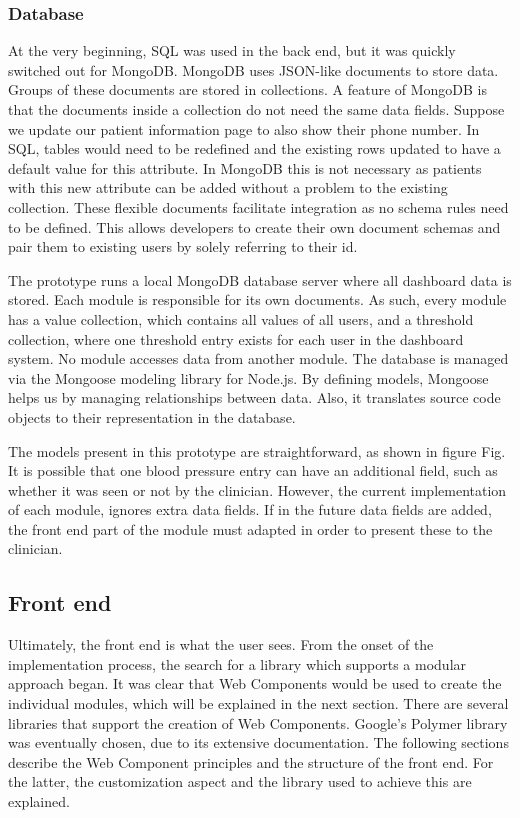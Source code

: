         \subsubsection{Database}

        At the very beginning, SQL was used in the back end, but it was quickly switched out for MongoDB\@. MongoDB uses JSON-like documents to store data. Groups of these documents are stored in collections. A feature of MongoDB is that the documents inside a collection do not need the same data fields. Suppose we update our patient information page to also show their phone number. In SQL, tables would need to be redefined and the existing rows updated to have a default value for this attribute. In MongoDB this is not necessary as  patients with this new attribute can be added without a problem to the existing collection. These flexible documents facilitate integration as no schema rules need to be defined. This allows developers to create their own document schemas and pair them to existing users by solely referring to their id. 

        The prototype runs a local MongoDB database server where all dashboard data is stored. Each module is responsible for its own documents. As such, every module has a value collection, which contains all values of all users, and a threshold collection, where one threshold entry exists for each user in the dashboard system. No module accesses data from another module. The database is managed via the Mongoose modeling library for Node.js. By defining models, Mongoose helps us by managing relationships between data. Also, it translates source code objects to their representation in the database.

        The models present in this prototype are straightforward, as shown in figure Fig. It is possible that one blood pressure entry can have an additional field, such as whether it was seen or not by the clinician. However, the current implementation of each module, ignores extra data fields. If in the future data fields are added, the front end part of the module must adapted in order to present these to the clinician.

    \subsection{Front end}

    Ultimately, the front end is what the user sees. From the onset of the implementation process, the search for a library which supports a modular approach began. It was clear that Web Components would be used to create the individual modules, which will be explained in the next section. There are several libraries that support the creation of Web Components. Google's Polymer library was eventually chosen, due to its extensive documentation. The following sections describe the Web Component principles and the structure of the front end. For the latter, the customization aspect and the library used to achieve this are explained.


